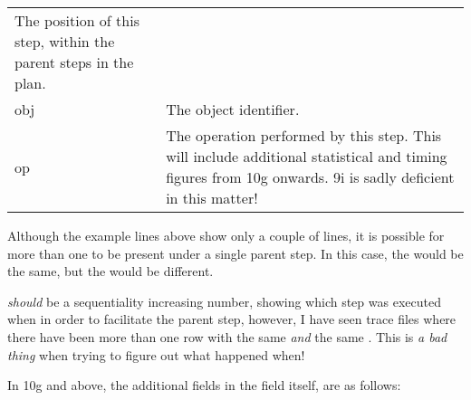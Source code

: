 \begin{longtable}[]{@{}l|l@{}}
\begin{minipage}[t]{0.65\columnwidth}
The position of this step, within the parent steps in the plan.\strut
\end{minipage}\tabularnewline
\begin{minipage}[t]{0.14\columnwidth}\raggedright\strut
obj\strut
\end{minipage} & \begin{minipage}[t]{0.65\columnwidth}\raggedright\strut
The object identifier.\strut
\end{minipage}\tabularnewline
\begin{minipage}[t]{0.14\columnwidth}\raggedright\strut
op\strut
\end{minipage} & \begin{minipage}[t]{0.65\columnwidth}\raggedright\strut
The operation performed by this step. This will include additional
statistical and timing figures from 10g onwards. 9i is sadly deficient
in this matter!\strut
\end{minipage}\tabularnewline
\bottomrule
\end{longtable}

Although the example  lines above show only a couple of lines, it is possible for more than one to be present under a single parent step. In this case, the  would be the same, but the  would be different.

\begin{warning}
 \emph{should} be a sequentiality increasing number, showing which step was executed when in order to facilitate the parent step, however, I have seen trace files where there have been more than one row with the same  \emph{and} the same . This is \emph{a bad thing} when trying to figure out what happened when!
\end{warning}

In 10g and above, the additional fields in the  field itself, are as follows:

